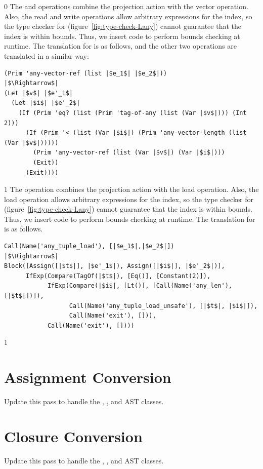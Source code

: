 \documentclass[7x10]{TimesAPriori_MIT}%
\def\racketEd{0}
\def\pythonEd{1}
\providecommand{\BookEdition}{1}
\let\edition\BookEdition
\newcommand{\pythonColor}[0]{}
\numberwithin{theorem}{chapter}
\numberwithin{definition}{chapter}
\numberwithin{equation}{chapter}
\begin{document}
{\if\edition\racketEd    
The  and  operations
combine the projection action with the vector operation.  Also, the
read and write operations allow arbitrary expressions for the index, so
the type checker for \LangAny{} (figure~\ref{fig:type-check-Lany})
cannot guarantee that the index is within bounds. Thus, we insert code
to perform bounds checking at runtime. The translation for
 is as follows, and the other two operations are
translated in a similar way:
\begin{center}
\begin{minipage}{0.95\textwidth}
\begin{lstlisting}
(Prim 'any-vector-ref (list |$e_1$| |$e_2$|))
|$\Rightarrow$|
(Let |$v$| |$e'_1$|
  (Let |$i$| |$e'_2$|
    (If (Prim 'eq? (list (Prim 'tag-of-any (list (Var |$v$|))) (Int 2)))
      (If (Prim '< (list (Var |$i$|) (Prim 'any-vector-length (list (Var |$v$|)))))
        (Prim 'any-vector-ref (list (Var |$v$|) (Var |$i$|)))
        (Exit))
      (Exit))))
\end{lstlisting}
\end{minipage}
\end{center}
\fi}
%
{\if\edition\pythonEd\pythonColor
%
The  operation combines the projection action
with the load operation.  Also, the load operation allows arbitrary
expressions for the index, so the type checker for \LangAny{}
(figure~\ref{fig:type-check-Lany}) cannot guarantee that the index is
within bounds. Thus, we insert code to perform bounds checking at
runtime. The translation for  is as follows.

\begin{lstlisting}
Call(Name('any_tuple_load'), [|$e_1$|,|$e_2$|])
|$\Rightarrow$|
Block([Assign([|$t$|], |$e'_1$|), Assign([|$i$|], |$e'_2$|)],
      IfExp(Compare(TagOf(|$t$|), [Eq()], [Constant(2)]),
            IfExp(Compare(|$i$|, [Lt()], [Call(Name('any_len'), [|$t$|])]),
                  Call(Name('any_tuple_load_unsafe'), [|$t$|, |$i$|]),
                  Call(Name('exit'), [])),
            Call(Name('exit'), [])))
\end{lstlisting}
\fi}


{\if\edition\pythonEd\pythonColor

\section{Assignment Conversion}
\label{sec:convert-assignments-Lany}

Update this pass to handle the , , and
 AST classes.

\section{Closure Conversion}
\label{sec:closure-conversion-Lany}

Update this pass to handle the , , and
 AST classes.

\fi}
\end{document}
